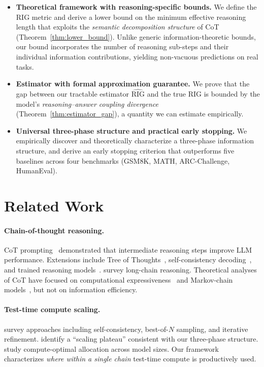 \documentclass{article}
\newcommand{\RIG}{\mathrm{RIG}}
\begin{document}
\begin{itemize}[leftmargin=*,itemsep=2pt,topsep=3pt]
    \item \textbf{Theoretical framework with reasoning-specific bounds.} We define the RIG metric and derive a lower bound on the minimum effective reasoning length that exploits the \emph{semantic decomposition structure} of CoT (Theorem~\ref{thm:lower_bound}). Unlike generic information-theoretic bounds, our bound incorporates the number of reasoning sub-steps and their individual information contributions, yielding non-vacuous predictions on real tasks.
    \item \textbf{Estimator with formal approximation guarantee.} We prove that the gap between our tractable estimator $\widehat{\RIG}$ and the true RIG is bounded by the model's \emph{reasoning--answer coupling divergence} (Theorem~\ref{thm:estimator_gap}), a quantity we can estimate empirically.
    \item \textbf{Universal three-phase structure and practical early stopping.} We empirically discover and theoretically characterize a three-phase information structure, and derive an early stopping criterion that outperforms five baselines across four benchmarks (GSM8K, MATH, ARC-Challenge, HumanEval).
\end{itemize}


\section{Related Work}
\label{sec:related}

\paragraph{Chain-of-thought reasoning.}
CoT prompting~\citep{wei2022chain} demonstrated that intermediate reasoning steps improve LLM performance. Extensions include Tree of Thoughts~\citep{yao2023tree}, self-consistency decoding~\citep{wang2023selfconsistency}, and trained reasoning models~\citep{deepseekr1, besta2025reasoning}. \citet{chen2025longcot} survey long-chain reasoning. Theoretical analyses of CoT have focused on computational expressiveness~\citep{feng2024towards, merrill2023expresssive, hu2024hopfieldian} and Markov-chain models~\citep{yang2024markovcot}, but not on information efficiency.

\paragraph{Test-time compute scaling.}
\citet{ji2025surveytts} survey approaches including self-consistency, best-of-$N$ sampling, and iterative refinement. \citet{wang2025scalingoverscaling} identify a ``scaling plateau'' consistent with our three-phase structure. \citet{liu2025can1b} study compute-optimal allocation across model sizes. Our framework characterizes \emph{where within a single chain} test-time compute is productively used.
\end{document}
